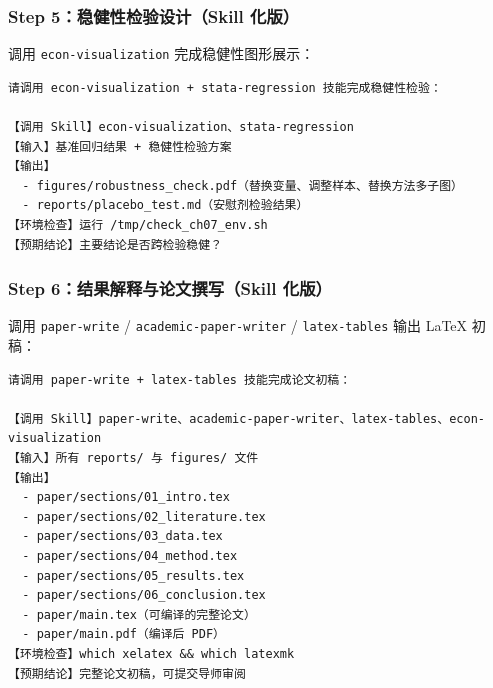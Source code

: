 \subsubsection{Step 5：稳健性检验设计（Skill 化版）}

调用 \texttt{econ-visualization} 完成稳健性图形展示：

\begin{lstlisting}
请调用 econ-visualization + stata-regression 技能完成稳健性检验：

【调用 Skill】econ-visualization、stata-regression
【输入】基准回归结果 + 稳健性检验方案
【输出】
  - figures/robustness_check.pdf（替换变量、调整样本、替换方法多子图）
  - reports/placebo_test.md（安慰剂检验结果）
【环境检查】运行 /tmp/check_ch07_env.sh
【预期结论】主要结论是否跨检验稳健？
\end{lstlisting}

\subsubsection{Step 6：结果解释与论文撰写（Skill 化版）}

调用 \texttt{paper-write} / \texttt{academic-paper-writer} / \texttt{latex-tables} 输出 LaTeX 初稿：

\begin{lstlisting}
请调用 paper-write + latex-tables 技能完成论文初稿：

【调用 Skill】paper-write、academic-paper-writer、latex-tables、econ-visualization
【输入】所有 reports/ 与 figures/ 文件
【输出】
  - paper/sections/01_intro.tex
  - paper/sections/02_literature.tex
  - paper/sections/03_data.tex
  - paper/sections/04_method.tex
  - paper/sections/05_results.tex
  - paper/sections/06_conclusion.tex
  - paper/main.tex（可编译的完整论文）
  - paper/main.pdf（编译后 PDF）
【环境检查】which xelatex && which latexmk
【预期结论】完整论文初稿，可提交导师审阅
\end{lstlisting}

